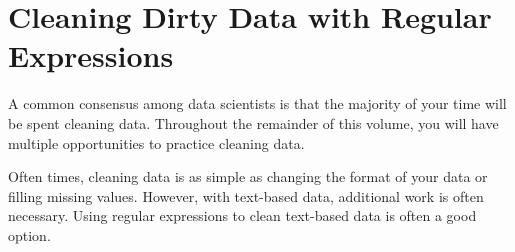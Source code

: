 \begin{comment}
Instead, use your previously defined regular expressions to make this easier. For example, either of the two following idioms will work:
\begin{lstlisting}
>>> key_1 = "basic"
>>> print ("This is a " + key_1 + " way to concatenate strings.")
This is a basic way to concatenate strings.
>>> format_dict = {"key_1": "basic", "key_2": "much more", "key_3": "advanced"}
>>> print ("This is a {key_2} {key_3} way to concatenate strings. It's {key_2} flexible.".format(**format_dict))
This is a much more advanced way to concatenate strings. It's much more flexible.
\end{lstlisting}
Keep in mind that you'll have to remove the line anchors from your previously defined regular expressions.

For reference, I used about ten lines to define \li{function_pattern_string} and used statements of the form \li{intermediate_pattern_string = r"(my regular expression here)".format()} four times.
\end{warn}

\label{prob:match_function_definition}
\end{problem*}
\end{comment}





\section*{Cleaning Dirty Data with Regular Expressions}
A common consensus among data scientists is that the majority of your time will be spent cleaning data. Throughout the remainder of this volume, you will have multiple opportunities to practice cleaning data.

Often times, cleaning data is as simple as changing the format of your data or filling missing values. However, with text-based data, additional work is often necessary. Using regular expressions to clean text-based data is often a good option.

